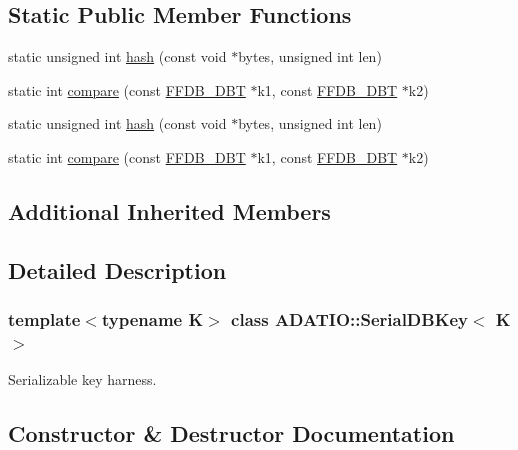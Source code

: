 \subsection*{Static Public Member Functions}
\begin{DoxyCompactItemize}
\item 
static unsigned int \mbox{\hyperlink{classADATIO_1_1SerialDBKey_a09904405d7dc203997431c6ca8af87ae}{hash}} (const void $\ast$bytes, unsigned int len)
\item 
static int \mbox{\hyperlink{classADATIO_1_1SerialDBKey_a5f73c31df1c824c61790ab7645fc030f}{compare}} (const \mbox{\hyperlink{other__libs_2filedb_2filehash_2ffdb__db_8h_aa2e0984399491df0fdd20898ca8758f9}{F\+F\+D\+B\+\_\+\+D\+BT}} $\ast$k1, const \mbox{\hyperlink{other__libs_2filedb_2filehash_2ffdb__db_8h_aa2e0984399491df0fdd20898ca8758f9}{F\+F\+D\+B\+\_\+\+D\+BT}} $\ast$k2)
\item 
static unsigned int \mbox{\hyperlink{classADATIO_1_1SerialDBKey_a09904405d7dc203997431c6ca8af87ae}{hash}} (const void $\ast$bytes, unsigned int len)
\item 
static int \mbox{\hyperlink{classADATIO_1_1SerialDBKey_a5f73c31df1c824c61790ab7645fc030f}{compare}} (const \mbox{\hyperlink{other__libs_2filedb_2filehash_2ffdb__db_8h_aa2e0984399491df0fdd20898ca8758f9}{F\+F\+D\+B\+\_\+\+D\+BT}} $\ast$k1, const \mbox{\hyperlink{other__libs_2filedb_2filehash_2ffdb__db_8h_aa2e0984399491df0fdd20898ca8758f9}{F\+F\+D\+B\+\_\+\+D\+BT}} $\ast$k2)
\end{DoxyCompactItemize}
\subsection*{Additional Inherited Members}


\subsection{Detailed Description}
\subsubsection*{template$<$typename K$>$\newline
class A\+D\+A\+T\+I\+O\+::\+Serial\+D\+B\+Key$<$ K $>$}

Serializable key harness. 



\subsection{Constructor \& Destructor Documentation}
\mbox{\label{classADATIO_1_1SerialDBKey_acaf28250dcc8a2b3944f7edef046df05}} 
